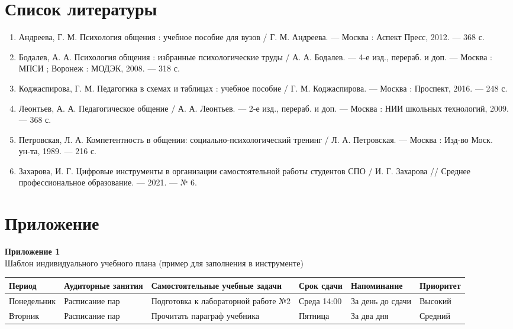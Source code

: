 \documentclass[14pt,a4paper]{article}
\begin{document}
\newpage
\section*{Список литературы}

\begin{enumerate}
    \item Андреева, Г. М. Психология общения : учебное пособие для вузов / Г. М. Андреева. — Москва : Аспект Пресс, 2012. — 368 с.
    \item Бодалев, А. А. Психология общения : избранные психологические труды / А. А. Бодалев. — 4‑е изд., перераб. и доп. — Москва : МПСИ ; Воронеж : МОДЭК, 2008. — 318 с.
    \item Коджаспирова, Г. М. Педагогика в схемах и таблицах : учебное пособие / Г. М. Коджаспирова. — Москва : Проспект, 2016. — 248 с.
    \item Леонтьев, А. А. Педагогическое общение / А. А. Леонтьев. — 2‑е изд., перераб. и доп. — Москва : НИИ школьных технологий, 2009. — 368 с.
    \item Петровская, Л. А. Компетентность в общении: социально‑психологический тренинг / Л. А. Петровская. — Москва : Изд‑во Моск. ун‑та, 1989. — 216 с.
    \item Захарова, И. Г. Цифровые инструменты в организации самостоятельной работы студентов СПО / И. Г. Захарова // Среднее профессиональное образование. — 2021. — № 6.
\end{enumerate}


\newpage
\section*{Приложение}

\textbf{Приложение 1}\\
Шаблон индивидуального учебного плана (пример для заполнения в инструменте)

\begin{tabular}{|l|l|l|l|l|l|}
\hline
Период & Аудиторные занятия & Самостоятельные учебные задачи & Срок сдачи & Напоминание & Приоритет \\
\hline
Понедельник & Расписание пар & Подготовка к лабораторной работе №2 & Среда 14:00 & За день до сдачи & Высокий \\
\hline
Вторник & Расписание пар & Прочитать параграф учебника & Пятница & За два дня & Средний \\
\hline
\end{tabular}
\end{document}
